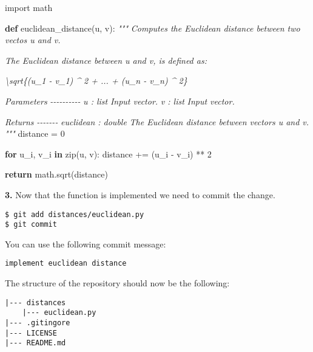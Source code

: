 \documentclass[11pt]{article}
\newenvironment{Shaded}{}{}
\newcommand{\KeywordTok}[1]{\textcolor[rgb]{0.00,0.44,0.13}{\textbf{{#1}}}}
\newcommand{\DecValTok}[1]{\textcolor[rgb]{0.25,0.63,0.44}{{#1}}}
\newcommand{\CommentTok}[1]{\textcolor[rgb]{0.38,0.63,0.69}{\textit{{#1}}}}
\newcommand{\NormalTok}[1]{{#1}}
\newcommand{\ImportTok}[1]{{#1}}
\newcommand{\ControlFlowTok}[1]{\textcolor[rgb]{0.00,0.44,0.13}{\textbf{{#1}}}}
\newcommand{\OperatorTok}[1]{\textcolor[rgb]{0.40,0.40,0.40}{{#1}}}
\newcommand{\BuiltInTok}[1]{{#1}}
\begin{document}
\begin{Shaded}
\begin{Highlighting}[]
\ImportTok{import}\NormalTok{ math }

\KeywordTok{def}\NormalTok{ euclidean\_distance(u, v):}
    \CommentTok{"""}
\CommentTok{    Computes the Euclidean distance between two vectos \textasciigrave{}u\textasciigrave{} and \textasciigrave{}v\textasciigrave{}.}

\CommentTok{    The Euclidean distance between \textasciigrave{}u\textasciigrave{} and \textasciigrave{}v\textasciigrave{}, is defined as:}

\CommentTok{    \textbackslash{}sqrt\{(u\_1 {-} v\_1) \^{} 2 + ... + (u\_n {-} v\_n) \^{} 2\}}

\CommentTok{    Parameters}
\CommentTok{    {-}{-}{-}{-}{-}{-}{-}{-}{-}{-}}
\CommentTok{    u : list}
\CommentTok{        Input vector.}
\CommentTok{    v : list}
\CommentTok{        Input vector.}

\CommentTok{    Returns}
\CommentTok{    {-}{-}{-}{-}{-}{-}{-}}
\CommentTok{    euclidean : double}
\CommentTok{        The Euclidean distance between vectors \textasciigrave{}u\textasciigrave{} and \textasciigrave{}v\textasciigrave{}.}
\CommentTok{    """}
\NormalTok{    distance }\OperatorTok{=} \DecValTok{0}
    
    \ControlFlowTok{for}\NormalTok{ u\_i, v\_i }\KeywordTok{in} \BuiltInTok{zip}\NormalTok{(u, v):}
\NormalTok{        distance }\OperatorTok{+=}\NormalTok{ (u\_i }\OperatorTok{{-}}\NormalTok{ v\_i) }\OperatorTok{**} \DecValTok{2}
        
    \ControlFlowTok{return}\NormalTok{ math.sqrt(distance)}
\end{Highlighting}
\end{Shaded}

\textbf{3.} Now that the function is implemented we need to commit the
change.

\begin{verbatim}
$ git add distances/euclidean.py
$ git commit
\end{verbatim}

You can use the following commit message:

\begin{verbatim}
implement euclidean distance
\end{verbatim}

    The structure of the repository should now be the following:

\begin{verbatim}
|--- distances
    |--- euclidean.py
|--- .gitingore
|--- LICENSE   
|--- README.md
\end{verbatim}
\end{document}
